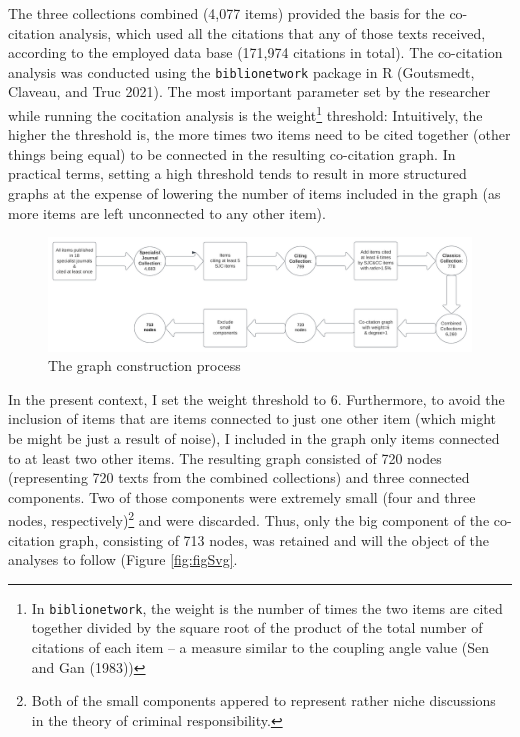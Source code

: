 \documentclass[
]{article}
\begin{document}
The three collections combined (4,077 items) provided the basis for the co-citation analysis, which used all the citations that any of those texts received, according to the employed data base (171,974 citations in total). The co-citation analysis was conducted using the \texttt{biblionetwork} package in R (Goutsmedt, Claveau, and Truc 2021). The most important parameter set by the researcher while running the cocitation analysis is the weight\footnote{In \texttt{biblionetwork}, the weight is the number of times the two items are cited together divided by the square root of the product of the total number of citations of each item -- a measure similar to the coupling angle value (Sen and Gan (1983))} threshold: Intuitively, the higher the threshold is, the more times two items need to be cited together (other things being equal) to be connected in the resulting co-citation graph. In practical terms, setting a high threshold tends to result in more structured graphs at the expense of lowering the number of items included in the graph (as more items are left unconnected to any other item).

\begin{figure}
\includegraphics[width=1\linewidth]{flowchart} \caption{The graph construction process}\label{fig:flowchart}
\end{figure}

In the present context, I set the weight threshold to 6. Furthermore, to avoid the inclusion of items that are items connected to just one other item (which might be might be just a result of noise), I included in the graph only items connected to at least two other items. The resulting graph consisted of 720 nodes (representing 720 texts from the combined collections) and three connected components. Two of those components were extremely small (four and three nodes, respectively)\footnote{Both of the small components appered to represent rather niche discussions in the theory of criminal responsibility.} and were discarded. Thus, only the big component of the co-citation graph, consisting of 713 nodes, was retained and will the object of the analyses to follow (Figure \ref{fig:figSvg}.
\end{document}
